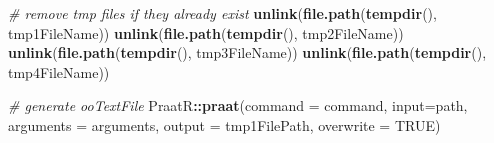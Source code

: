 \documentclass[]{book}
\newenvironment{Shaded}{\begin{snugshade}}{\end{snugshade}}
\newcommand{\CommentTok}[1]{\textcolor[rgb]{0.56,0.35,0.01}{\textit{#1}}}
\newcommand{\DataTypeTok}[1]{\textcolor[rgb]{0.13,0.29,0.53}{#1}}
\newcommand{\KeywordTok}[1]{\textcolor[rgb]{0.13,0.29,0.53}{\textbf{#1}}}
\newcommand{\NormalTok}[1]{#1}
\newcommand{\OperatorTok}[1]{\textcolor[rgb]{0.81,0.36,0.00}{\textbf{#1}}}
\newcommand{\OtherTok}[1]{\textcolor[rgb]{0.56,0.35,0.01}{#1}}
\begin{document}
\begin{Shaded}
\begin{Highlighting}[]
  \CommentTok{# remove tmp files if they already exist}
  \KeywordTok{unlink}\NormalTok{(}\KeywordTok{file.path}\NormalTok{(}\KeywordTok{tempdir}\NormalTok{(), tmp1FileName))}
  \KeywordTok{unlink}\NormalTok{(}\KeywordTok{file.path}\NormalTok{(}\KeywordTok{tempdir}\NormalTok{(), tmp2FileName))}
  \KeywordTok{unlink}\NormalTok{(}\KeywordTok{file.path}\NormalTok{(}\KeywordTok{tempdir}\NormalTok{(), tmp3FileName))}
  \KeywordTok{unlink}\NormalTok{(}\KeywordTok{file.path}\NormalTok{(}\KeywordTok{tempdir}\NormalTok{(), tmp4FileName))}

  \CommentTok{# generate ooTextFile}
\NormalTok{  PraatR}\OperatorTok{::}\KeywordTok{praat}\NormalTok{(}\DataTypeTok{command =}\NormalTok{ command,}
                \DataTypeTok{input=}\NormalTok{path,}
                \DataTypeTok{arguments =}\NormalTok{ arguments,}
                \DataTypeTok{output =}\NormalTok{ tmp1FilePath,}
                \DataTypeTok{overwrite =} \OtherTok{TRUE}\NormalTok{)}


\end{Highlighting}
\end{Shaded}
\end{document}
